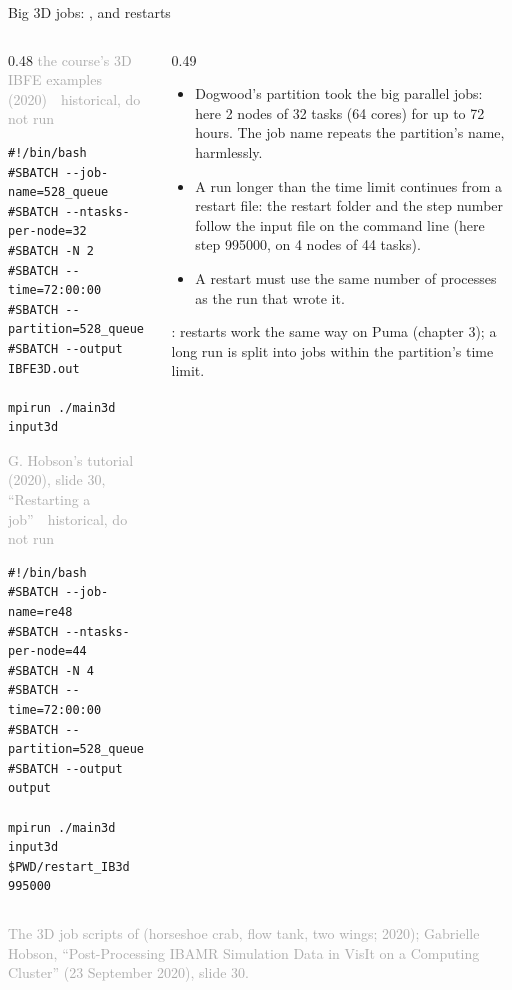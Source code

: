 \documentclass[aspectratio=169,11pt]{beamer}
\newcommand{\sourcecredit}[1]{\vfill\begin{flushright}\tiny\textcolor{DarkGray}{#1}\end{flushright}}
\newcommand{\hist}[1]{{\tiny\sffamily\textcolor{DarkGray}{#1\ \textbullet\ historical, do not run}}\par\nointerlineskip\vspace{0.3mm}}
\begin{document}
\begin{frame}[fragile]{Big 3D jobs: , and restarts}
\label{fr:528}
\begin{columns}[T,onlytextwidth]
\begin{column}{0.48\textwidth}
\hist{the course's 3D IBFE examples (2020)}
\begin{lstlisting}[style=hist]
#!/bin/bash
#SBATCH --job-name=528_queue
#SBATCH --ntasks-per-node=32
#SBATCH -N 2
#SBATCH --time=72:00:00
#SBATCH --partition=528_queue
#SBATCH --output IBFE3D.out

mpirun ./main3d input3d
\end{lstlisting}
\hist{G. Hobson's tutorial (2020), slide 30, ``Restarting a job''}
\begin{lstlisting}[style=hist]
#!/bin/bash
#SBATCH --job-name=re48
#SBATCH --ntasks-per-node=44
#SBATCH -N 4
#SBATCH --time=72:00:00
#SBATCH --partition=528_queue
#SBATCH --output output

mpirun ./main3d input3d $PWD/restart_IB3d 995000
\end{lstlisting}
\end{column}
\begin{column}{0.49\textwidth}
\footnotesize
\begin{itemize}\setlength{\itemsep}{2pt}
  \item Dogwood's  partition took the big parallel jobs: here 2 nodes of 32 tasks (64 cores) for up to 72 hours. The job name repeats the partition's name, harmlessly.
  \item A run longer than the time limit continues from a restart file: the restart folder and the step number follow the input file on the command line (here step 995000, on 4 nodes of 44 tasks).
  \item A restart must use the same number of processes as the run that wrote it.
\end{itemize}
\vspace{1mm}
: restarts work the same way on Puma (chapter 3); a long run is split into jobs within the partition's time limit.
\end{column}
\end{columns}
\sourcecredit{The 3D job scripts of \code{examples/legacy/UNC-Examples} (horseshoe crab, flow tank, two wings; 2020); Gabrielle Hobson, ``Post-Processing IBAMR Simulation Data in VisIt on a Computing Cluster'' (23 September 2020), slide 30.}
\end{frame}
\end{document}

